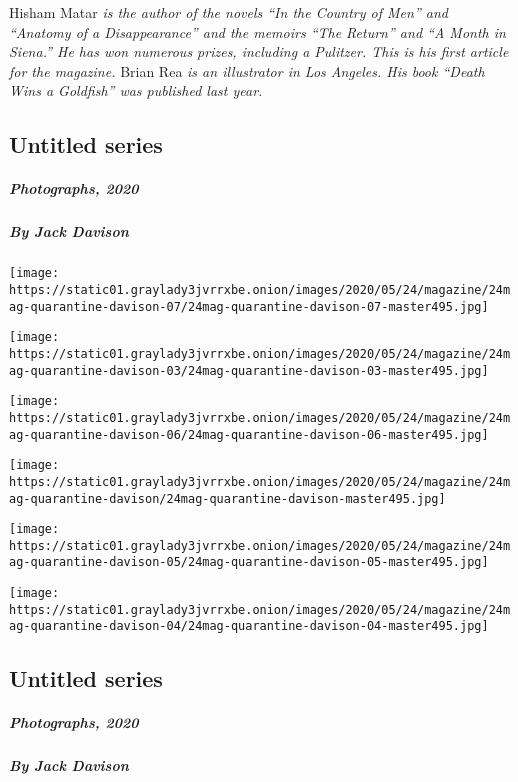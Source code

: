 Hisham Matar \emph{is the author of the novels ``In the Country of Men''
and ``Anatomy of a Disappearance'' and the memoirs ``The Return'' and
``A Month in Siena.'' He has won numerous prizes, including a Pulitzer.
This is his first article for the magazine.} Brian Rea \emph{is an
illustrator in Los Angeles. His book ``Death Wins a Goldfish'' was
published last year.}

\hypertarget{untitled-series}{%
\subsection{Untitled series}\label{untitled-series}}

\hypertarget{photographs-2020}{%
\subparagraph{Photographs, 2020}\label{photographs-2020}}

\hypertarget{by-jack-davison}{%
\subparagraph{By Jack Davison}\label{by-jack-davison}}

\texttt{[image: https://static01.graylady3jvrrxbe.onion/images/2020/05/24/magazine/24mag-quarantine-davison-07/24mag-quarantine-davison-07-master495.jpg]}

\texttt{[image: https://static01.graylady3jvrrxbe.onion/images/2020/05/24/magazine/24mag-quarantine-davison-03/24mag-quarantine-davison-03-master495.jpg]}

\texttt{[image: https://static01.graylady3jvrrxbe.onion/images/2020/05/24/magazine/24mag-quarantine-davison-06/24mag-quarantine-davison-06-master495.jpg]}

\texttt{[image: https://static01.graylady3jvrrxbe.onion/images/2020/05/24/magazine/24mag-quarantine-davison/24mag-quarantine-davison-master495.jpg]}

\texttt{[image: https://static01.graylady3jvrrxbe.onion/images/2020/05/24/magazine/24mag-quarantine-davison-05/24mag-quarantine-davison-05-master495.jpg]}

\texttt{[image: https://static01.graylady3jvrrxbe.onion/images/2020/05/24/magazine/24mag-quarantine-davison-04/24mag-quarantine-davison-04-master495.jpg]}

\hypertarget{untitled-series-1}{%
\subsection{Untitled series}\label{untitled-series-1}}

\hypertarget{photographs-2020-1}{%
\subparagraph{Photographs, 2020}\label{photographs-2020-1}}

\hypertarget{by-jack-davison-1}{%
\subparagraph{By Jack Davison}\label{by-jack-davison-1}}


